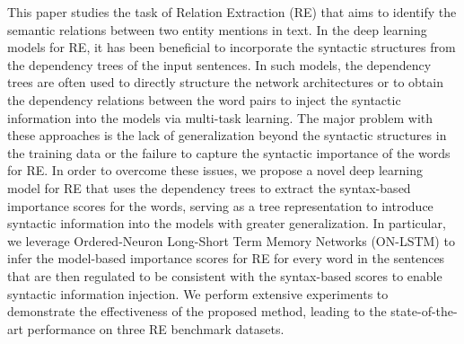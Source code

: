 This paper studies the task of Relation Extraction (RE) that aims to identify the semantic relations between two entity mentions in text. In the deep learning models for RE, it has been beneficial to incorporate the syntactic structures from the dependency trees of the input sentences. In such models, the dependency trees are often used to directly structure the network architectures or to obtain the dependency relations between the word pairs to inject the syntactic information into the models via multi-task learning. The major problem with these approaches is the lack of generalization beyond the syntactic structures in the training data or the failure to capture the syntactic importance of the words for RE. In order to overcome these issues, we propose a novel deep learning model for RE that uses the dependency trees to extract the syntax-based importance scores for the words, serving as a tree representation to introduce syntactic information into the models with greater generalization. In particular, we leverage Ordered-Neuron Long-Short Term Memory Networks (ON-LSTM) to infer the model-based importance scores for RE for every word in the sentences that are then regulated to be consistent with the syntax-based scores to enable syntactic information injection. We perform extensive experiments to demonstrate the effectiveness of the proposed method, leading to the state-of-the-art performance on three RE benchmark datasets.
